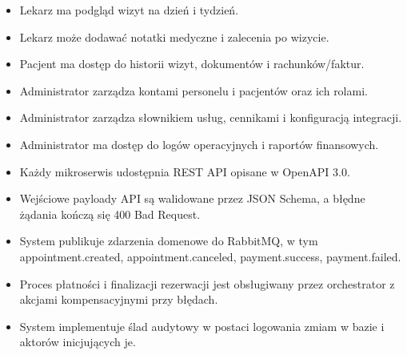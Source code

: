 \documentclass[12pt]{article}
\begin{document}
\begin{itemize}
\item Lekarz ma podgląd wizyt na dzień i tydzień.
\item Lekarz może dodawać notatki medyczne i zalecenia po wizycie.
\item Pacjent ma dostęp do historii wizyt, dokumentów i rachunków/faktur.
\item Administrator zarządza kontami personelu i pacjentów oraz ich rolami.
\item Administrator zarządza słownikiem usług, cennikami i konfiguracją integracji.
\item Administrator ma dostęp do logów operacyjnych i raportów finansowych.
\item Każdy mikroserwis udostępnia REST API opisane w OpenAPI 3.0.
\item Wejściowe payloady API są walidowane przez JSON Schema, a błędne żądania kończą się 400 Bad Request.
\item System publikuje zdarzenia domenowe do RabbitMQ, w tym appointment.created, appointment.canceled, payment.success, payment.failed.
\item Proces płatności i finalizacji rezerwacji jest obsługiwany przez orchestrator z akcjami kompensacyjnymi przy błędach.
\item System implementuje ślad audytowy w postaci logowania zmiam w bazie i aktorów inicjujących je. 
\end{itemize}
\end{document}
